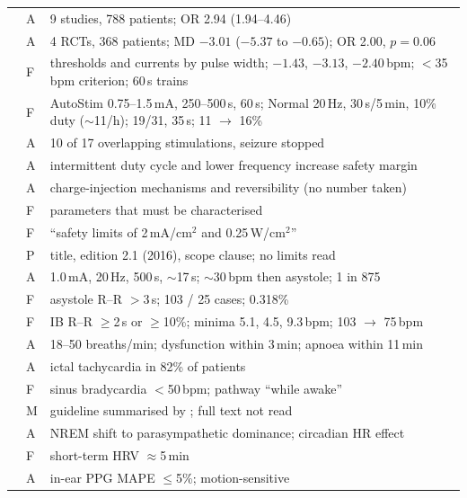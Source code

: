 \documentclass[10pt,a4paper]{article}
\newcommand{\us}{\texorpdfstring{\,\textmu s}{ us}}
\begin{document}
\begin{longtable}{L{3.4cm}L{0.8cm}L{10.9cm}}
\textcite{zhang2024} & A & 9 studies, 788 patients; OR 2.94 (1.94--4.46) \\
\textcite{moro2025} & A & 4 RCTs, 368 patients; MD $-3.01$ ($-5.37$ to $-0.65$); OR 2.00, $p=0.06$ \\
\textcite{badran2018} & F & thresholds and currents by pulse width; $-1.43$, $-3.13$, $-2.40$\,bpm; $<$35\,bpm criterion; 60\,s trains \\
\textcite{fisher2016} & F & AutoStim 0.75--1.5\,mA, 250--500\us, 60\,s; Normal 20\,Hz, 30\,s/5\,min, 10\% duty ($\sim$11/h); 19/31, 35\,s; 11 $\rightarrow$ 16\% \\
\textcite{boon2015} & A & 10 of 17 overlapping stimulations, seizure stopped \\
\textcite{agnew1990} & A & intermittent duty cycle and lower frequency increase safety margin \\
\textcite{merrill2005} & A & charge-injection mechanisms and reversibility (no number taken) \\
\textcite{cfr8825891} & F & parameters that must be characterised \\
\textcite{fdak241678} & F & ``safety limits of 2\,mA/cm$^2$ and 0.25\,W/cm$^2$'' \\
\textcite{iec60601210} & P & title, edition 2.1 (2016), scope clause; no limits read \\
\textcite{asconape1999} & A & 1.0\,mA, 20\,Hz, 500\us, $\sim$17\,s; $\sim$30\,bpm then asystole; 1 in 875 \\
\textcite{vanderlende2016} & F & asystole R--R $>$3\,s; 103 / 25 cases; 0.318\% \\
\textcite{muccioli2024} & F & IB R--R $\ge$2\,s or $\ge$10\%; minima 5.1, 4.5, 9.3\,bpm; 103 $\rightarrow$ 75\,bpm \\
\textcite{ryvlin2013} & A & 18--50 breaths/min; dysfunction within 3\,min; apnoea within 11\,min \\
\textcite{eggleston2014} & A & ictal tachycardia in 82\% of patients \\
\textcite{acc2018gms} & F & sinus bradycardia $<$50\,bpm; pathway ``while awake'' \\
\textcite{kusumoto2019} & M & guideline summarised by \textcite{acc2018gms}; full text not read \\
\textcite{trinder2001} & A & NREM shift to parasympathetic dominance; circadian HR effect \\
\textcite{shaffer2017} & F & short-term HRV $\approx$5\,min \\
\textcite{passler2019} & A & in-ear PPG MAPE $\le$5\%; motion-sensitive \\

\end{longtable}
\end{document}
